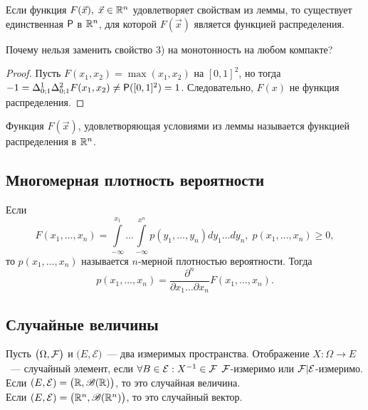 \begin{theorem}
	Если функция $F(\vec x),\; \vec x \in \R^n$ удовлетворяет свойствам из леммы, то существует единственная $\P$ в $\R^n$, для которой $F(\vec x)$ является функцией распределения.
\end{theorem}
\begin{note}
	Почему нельзя заменить свойство 3) на монотонность на любом компакте? 
	\begin{proof}
		Пусть $F(x_1, x_2) = \max(x_1, x_2)$ на $[0, 1]^2$, но тогда $-1 = \Delta_{0; 1}^1 \Delta_{0; 1}^2 F(x_1, x_2) \neq \P([0, 1]^2) = 1$. Следовательно, $F(x)$ не функция распределения.
	\end{proof}
\end{note}
\begin{definition}
	Функция $F(\vec x)$, удовлетворяющая условиями из леммы называется функцией распределения в $\R^n$.
\end{definition}
\subsection{Многомерная плотность вероятности}
\begin{definition}
	Если 
	$$ F(x_1, \ldots, x_n) = \int\limits_{-\infty}^{x_1}\ldots\int\limits_{-\infty}^{x^n} p(y_1, \ldots, y_n)dy_1\ldots dy_n,\; p(x_1, \ldots, x_n) \geqslant 0, $$ 
	то $p(x_1, \ldots, x_n)$ называется $n$-мерной плотностью вероятности. Тогда
	$$ p(x_1, \ldots, x_n) = \frac{\partial^n}{\partial x_1\ldots\partial x_n}F(x_1, \ldots, x_n). $$
\end{definition}
\subsection{Случайные величины}
\begin{definition}
	Пусть $\big(\Omega, \F \big)$ и $\big( E, \mathcal{E} \big)$~--- два измеримых пространства. Отображение $X: \Omega \rightarrow E$~--- случайный элемент, если $\forall B \in \mathcal{E}: X^{-1} \in \F$ $\F$-измеримо или $\F|\mathcal{E}$-измеримо. \\
	Если $(E, \mathcal{E}) = \big(\R, \B(\R)\big)$, то это случайная величина. \\
	Если $(E, \mathcal{E}) = \big(\R^n, \B(\R^n)\big)$, то это случайный вектор.
\end{definition}
